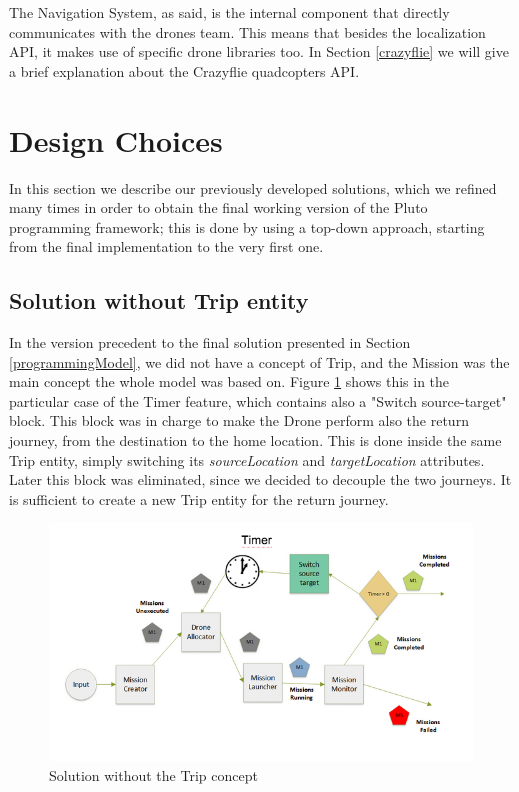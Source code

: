 The Navigation System, as said, is the internal component that directly communicates with the drones team. This means that besides the localization API, it makes use of specific drone libraries too.
In Section \ref{crazyflie} we will give a brief explanation about the Crazyflie quadcopters API.
\\

\section{Design Choices}\label{history}

In this section we describe our previously developed solutions, which we refined many times in order to obtain the final working version of the Pluto programming framework; this is done by using a top-down approach, starting from the final implementation to the very first one.

\subsection{Solution without Trip entity}

In the version precedent to the final solution presented in Section \ref{programmingModel}, we did not have a concept of Trip, and the Mission was the main concept the whole model was based on. 
Figure \ref{fig:noTrip} shows this in the particular case of the Timer feature, which contains also a "Switch source-target" block. 
This block was in charge to make the Drone perform also the return journey, from the destination to the home location.
This is done inside the same Trip entity, simply switching its \textit{sourceLocation} and \textit{targetLocation} attributes.
Later this block was eliminated, since we decided to decouple the two journeys.
It is sufficient to create a new Trip entity for the return journey.

\begin{figure}[H]
  \centering
  \includegraphics[width=\linewidth]{pictures/NoTrip.png}
  \caption{Solution without the Trip concept}
  \label{fig:noTrip}
\end{figure}

